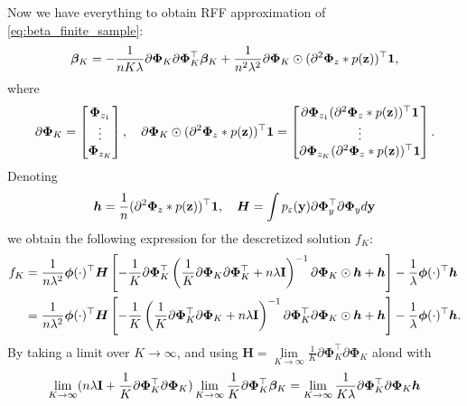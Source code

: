 Now we have everything to obtain RFF approximation of \eqref{eq:beta_finite_sample}:
\begin{align*}
    {\bm \beta}_K = -\frac{1}{nK\lambda}\partial {\bm \Phi}_K\partial {\bm \Phi}_K^{\top}{\bm \beta}_K  + \frac{1}{n^2\lambda^2}\partial{\bm \Phi}_K \odot (\partial^2 {\bm \Phi}_z * p({\bf z}))^{\top}{\bf 1},
\end{align*}
where
\[  \partial {\bm \Phi}_K =
    \begin{bmatrix}
        {\bm \Phi}_{z_1}\\
        \vdots\\
        {\bm \Phi}_{z_K}
    \end{bmatrix}, \quad
    \partial{\bm \Phi}_K \odot (\partial^2 {\bm \Phi}_z * p({\bf z}))^{\top}{\bf 1} =
    \begin{bmatrix}
        \partial{\bm \Phi}_{z_1}(\partial^2 {\bm \Phi}_z * p({\bf z}))^{\top}{\bf 1}\\
        \vdots\\
        \partial{\bm \Phi}_{z_K}(\partial^2 {\bm \Phi}_z * p({\bf z}))^{\top}{\bf 1}
    \end{bmatrix}.
\]
Denoting
\begin{equation*}
    {\bm h} = \frac{1}{n}(\partial^2 {\bm \Phi}_z * p({\bf z}))^{\top}{\bf 1},
    \quad
    {\bm H} =
    \int p_{\varepsilon}({\bf y})\partial{\bm \Phi}_y^{\top}\partial{\bm \Phi}_y d{\bf y}
\end{equation*}
we obtain the following expression for the descretized solution $f_K$:
\begin{align*}
    f_K
    &= \frac{1}{n\lambda^2}{\bm \phi}(\cdot)^{\top}{\bm H} \left[-\frac{1}{K}\partial {\bm \Phi}_K^{\top}\left(\frac{1}{K}\partial {\bm \Phi}_K\partial {\bm \Phi}_K^{\top} + n\lambda {\bf I}\right)^{-1}\partial{\bm \Phi}_K \odot {\bm h} + {\bm h}\right]
   -\frac{1}{\lambda} {\bm \phi}(\cdot)^{\top}{\bm h}\\
    &= \frac{1}{n\lambda^2}{\bm \phi}(\cdot)^{\top}{\bm H}
    \left[-\frac{1}{K}\left(\frac{1}{K}\partial  {\bm \Phi}_K^{\top}\partial{\bm \Phi}_K + n\lambda {\bf I}\right)^{-1}\partial {\bm \Phi}_K^{\top}\partial{\bm \Phi}_K \odot {\bm h} + {\bm h}\right]
    -\frac{1}{\lambda} {\bm \phi}(\cdot)^{\top}{\bm h}.
\end{align*}
By taking a limit over $K \to \infty$, and using
${\bm H} = \lim\limits_{K \to \infty}\frac{1}{K}\partial {\bm \Phi}_K^{\top}\partial{\bm\Phi}_K$ alond with
\begin{equation*}
    \lim\limits_{K \to \infty}(n\lambda{\bf I} + \frac{1}{K}\partial {\bm \Phi}^{\top}_K\partial {\bm \Phi}_K) \lim\limits_{K \to \infty}\frac{1}{K}\partial {\bm \Phi}^{\top}_K{\bm \beta}_K = \lim\limits_{K \to \infty}\frac{1}{K\lambda}\partial {\bm \Phi}^{\top}_K\partial {\bm \Phi}_K{\bm h}
\end{equation*}

